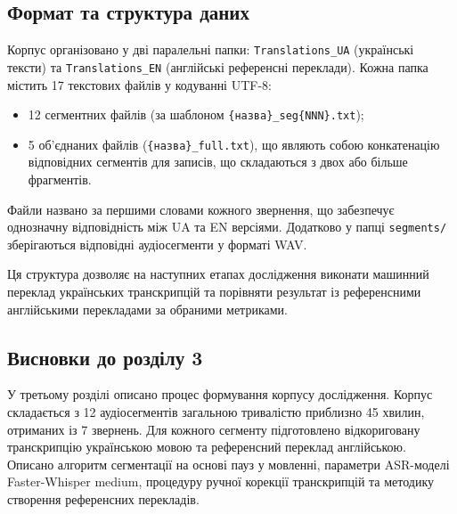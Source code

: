 \subsection{Формат та структура даних}

Корпус організовано у дві паралельні папки: \texttt{Translations\_UA}
(українські тексти) та \texttt{Translations\_EN} (англійські референсні
переклади). Кожна папка містить 17 текстових файлів у кодуванні UTF-8:
\begin{itemize}[nosep]
    \item 12 сегментних файлів (за шаблоном
    \texttt{\{назва\}\_seg\{NNN\}.txt});
    \item 5 об'єднаних файлів (\texttt{\{назва\}\_full.txt}), що являють
    собою конкатенацію відповідних сегментів для записів, що складаються
    з двох або більше фрагментів.
\end{itemize}

Файли названо за першими словами кожного звернення, що забезпечує однозначну
відповідність між UA та EN версіями. Додатково у папці \texttt{segments/}
зберігаються відповідні аудіосегменти у форматі WAV.

Ця структура дозволяє на наступних етапах дослідження виконати машинний
переклад українських транскрипцій та порівняти результат із референсними
англійськими перекладами за обраними метриками.

\subsection{Висновки до розділу 3}

У третьому розділі описано процес формування корпусу дослідження. Корпус
складається з 12 аудіосегментів загальною тривалістю приблизно 45 хвилин,
отриманих із 7 звернень. Для кожного сегменту
підготовлено відкориговану транскрипцію українською мовою та референсний
переклад англійською. Описано алгоритм сегментації на основі пауз у
мовленні, параметри ASR-моделі Faster-Whisper medium, процедуру ручної
корекції транскрипцій та методику створення референсних перекладів.

\clearpage
